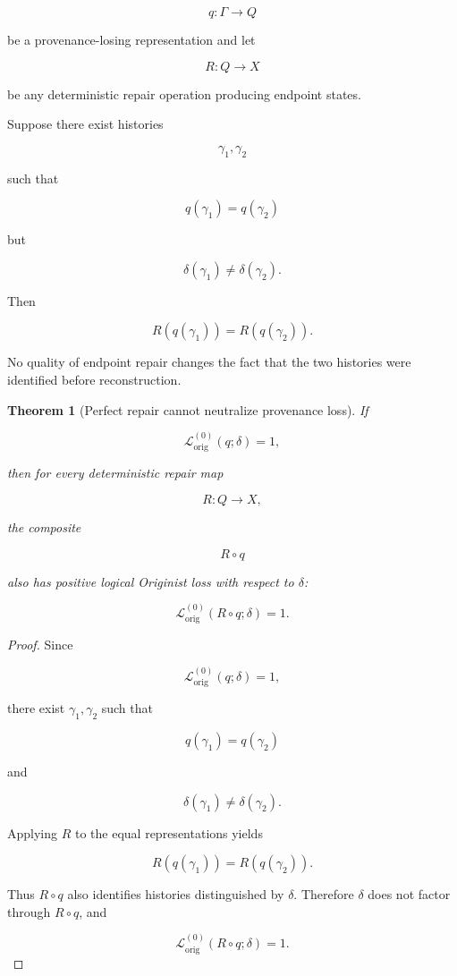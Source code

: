 \documentclass[
  11pt,
  a4paper,
  DIV=12,
  BCOR=0mm,
  parskip=half-
]{scrartcl}
\newcommand{\lossorig}{%
  \mathscr L_{\mathrm{orig}}%
}
\theoremstyle{definition}
\theoremstyle{plain}
\newtheorem{theorem}[definition]{Theorem}
\theoremstyle{remark}
\begin{document}
\[
  q:\Gamma\to Q
\]

be a provenance-losing representation and let

\[
  R:Q\to X
\]

be any deterministic repair operation producing endpoint states.

Suppose there exist histories

\[
  \gamma_1,\gamma_2
\]

such that

\[
  q(\gamma_1)=q(\gamma_2)
\]

but

\[
  \delta(\gamma_1)\neq\delta(\gamma_2).
\]

Then

\[
  R(q(\gamma_1))
  =
  R(q(\gamma_2)).
\]

No quality of endpoint repair changes the fact that the two histories were
identified before reconstruction.

\begin{theorem}[Perfect repair cannot neutralize provenance loss]
\label{thm:perfect-repair}
If

\[
  \lossorig^{(0)}(q;\delta)=1,
\]

then for every deterministic repair map

\[
  R:Q\to X,
\]

the composite

\[
  R\circ q
\]

also has positive logical Originist loss with respect to \(\delta\):

\[
  \lossorig^{(0)}(R\circ q;\delta)=1.
\]
\end{theorem}

\begin{proof}
Since

\[
  \lossorig^{(0)}(q;\delta)=1,
\]

there exist \(\gamma_1,\gamma_2\) such that

\[
  q(\gamma_1)=q(\gamma_2)
\]

and

\[
  \delta(\gamma_1)\neq\delta(\gamma_2).
\]

Applying \(R\) to the equal representations yields

\[
  R(q(\gamma_1))
  =
  R(q(\gamma_2)).
\]

Thus \(R\circ q\) also identifies histories distinguished by \(\delta\).
Therefore \(\delta\) does not factor through \(R\circ q\), and

\[
  \lossorig^{(0)}(R\circ q;\delta)=1.
\]
\end{proof}
\end{document}
